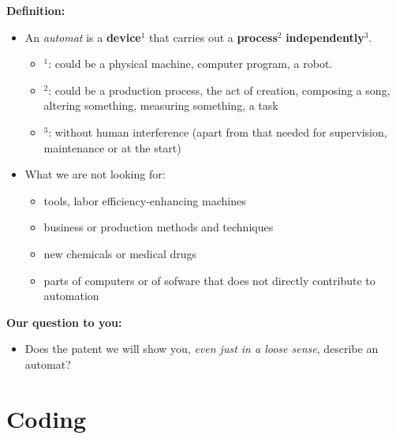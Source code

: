 \documentclass[10pt]{beamer}
\begin{document}
\begin{frame}
\textcolor{beamer@blendedblue}{\textbf{Definition:}}

	\begin{itemize}	
	\item An \textit{automat} is a \textbf{device}$^1$ that carries out a \textbf{process}$^2$ \textbf{independently}$^3$.
		\begin{itemize}	
		\item $^1$: could be a physical machine, computer program, a robot.
		\item $^2$: could be a production process, the act of creation, composing a song, altering something, measuring something, a task
		\item $^3$: without human interference (apart from that needed for supervision, maintenance or at the start)
		\end{itemize}
		\item What we are not looking for: 
			\begin{itemize}
			\item tools, labor efficiency-enhancing machines
			\item business or production methods and techniques
			\item new chemicals or medical drugs
			\item parts of computers or of sofware that does not directly contribute to automation
			\end{itemize}			
	\end{itemize}
\vspace{0.6cm}
\textcolor{beamer@blendedblue}{\textbf{Our question to you:}}
	\begin{itemize}	
	\item Does the patent we will show you, \textit{even just in a loose sense}, describe an automat?
	\end{itemize}
\end{frame}



\section{Coding}
\setcounter{subsection}{1} %
\end{document}
